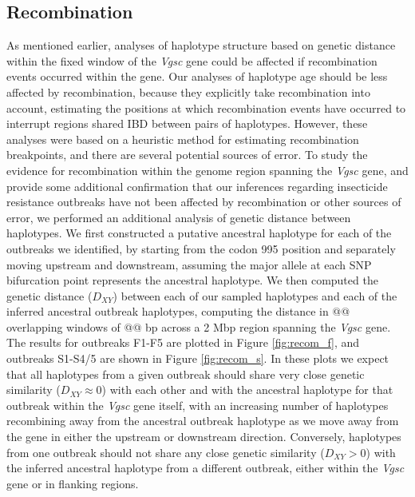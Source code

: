\documentclass[a4paper,11pt,abstracton]{scrartcl}
\begin{document}
\subsection*{Recombination}


%
As mentioned earlier, analyses of haplotype structure based on genetic distance within the fixed window of the \textit{Vgsc} gene could be affected if recombination events occurred within the gene.
%
Our analyses of haplotype age should be less affected by recombination, because they explicitly take recombination into account, estimating the positions at which recombination events have occurred to interrupt regions shared IBD between pairs of haplotypes.
%
However, these analyses were based on a heuristic method for estimating recombination breakpoints, and there are several potential sources of error.
%
To study the evidence for recombination within the genome region spanning the \textit{Vgsc} gene, and provide some additional confirmation that our inferences regarding insecticide resistance outbreaks have not been affected by recombination or other sources of error, we performed an additional analysis of genetic distance between haplotypes.
%
We first constructed a putative ancestral haplotype for each of the outbreaks we identified, by starting from the codon 995 position and separately moving upstream and downstream, assuming the major allele at each SNP bifurcation point represents the ancestral haplotype.
%
We then computed the genetic distance ($D_{XY}$) between each of our sampled haplotypes and each of the inferred ancestral outbreak haplotypes, computing the distance in @@ overlapping windows of @@ bp across a 2 Mbp region spanning the \textit{Vgsc} gene.
%
The results for outbreaks F1-F5 are plotted in Figure \ref{fig:recom_f}, and outbreaks S1-S4/5 are shown in Figure \ref{fig:recom_s}.
%
In these plots we expect that all haplotypes from a given outbreak should share very close genetic similarity ($D_{XY} \approx 0$) with each other and with the ancestral haplotype for that outbreak within the \textit{Vgsc} gene itself, with an increasing number of haplotypes recombining away from the ancestral outbreak haplotype as we move away from the gene in either the upstream or downstream direction.
%
Conversely, haplotypes from one outbreak should not share any close genetic similarity ($D_{XY} > 0$) with the inferred ancestral haplotype from a different outbreak, either within the \textit{Vgsc} gene or in flanking regions.
\end{document}
